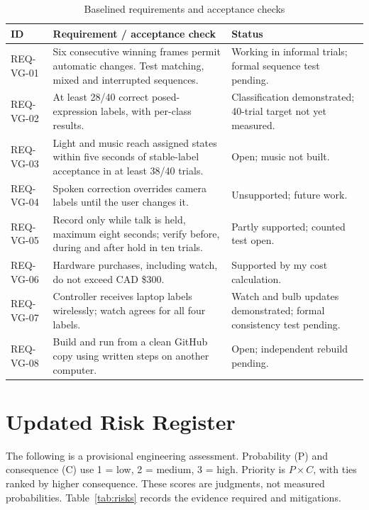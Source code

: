 \documentclass[conference,letterpaper]{IEEEtran}
\begin{document}
\begin{table}[!t]\caption{Baselined requirements and acceptance checks}\label{tab:requirements}\centering\footnotesize
\begin{tabularx}{\linewidth}{|>{\raggedright\arraybackslash}p{1.65cm}|Y|>{\raggedright\arraybackslash}p{2.8cm}|}
\hline
\textbf{ID} & \textbf{Requirement / acceptance check} & \textbf{Status}\\ \hline
REQ-VG-01 &
Six consecutive winning frames permit automatic changes.
Test matching, mixed and interrupted sequences. &
Working in informal trials; formal sequence test pending.\\ \hline
REQ-VG-02 &
At least 28/40 correct posed-expression labels, with per-class results. &
Classification demonstrated; 40-trial target not yet measured.\\ \hline
REQ-VG-03 &
Light and music reach assigned states within five seconds of stable-label
acceptance in at least 38/40 trials. &
Open; music not built.\\ \hline
REQ-VG-04 &
Spoken correction overrides camera labels until the user changes it. &
Unsupported; future work.\\ \hline
REQ-VG-05 &
Record only while talk is held, maximum eight seconds;
verify before, during and after hold in ten trials. &
Partly supported; counted test open.\\ \hline
REQ-VG-06 &
Hardware purchases, including watch, do not exceed CAD \$300. &
Supported by my cost calculation.\\ \hline
REQ-VG-07 &
Controller receives laptop labels wirelessly; watch agrees for all four labels. &
Watch and bulb updates demonstrated; formal consistency test pending.\\ \hline
REQ-VG-08 &
Build and run from a clean GitHub copy using written steps on another computer. &
Open; independent rebuild pending.\\ \hline
\end{tabularx}
\end{table}



\section{Updated Risk Register}

The following is a provisional engineering assessment.
Probability (P) and consequence (C) use 1 = low, 2 = medium,
3 = high. Priority is $P \times C$, with ties ranked by higher
consequence. These scores are judgments, not measured probabilities. Table~\ref{tab:risks} records the evidence required and mitigations.
\end{document}
